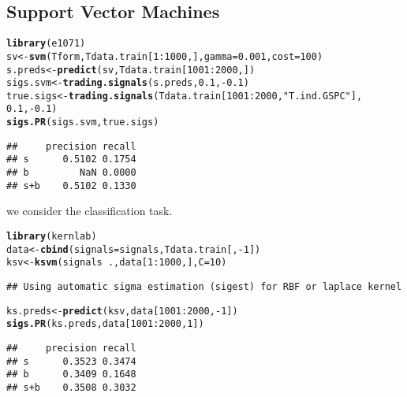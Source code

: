 \documentclass{article}\usepackage[]{graphicx}\usepackage[]{color}
\makeatletter
\newcommand{\hlnum}[1]{\textcolor[rgb]{0.686,0.059,0.569}{#1}}%
\newcommand{\hlstr}[1]{\textcolor[rgb]{0.192,0.494,0.8}{#1}}%
\newcommand{\hlopt}[1]{\textcolor[rgb]{0,0,0}{#1}}%
\newcommand{\hlstd}[1]{\textcolor[rgb]{0.345,0.345,0.345}{#1}}%
\newcommand{\hlkwb}[1]{\textcolor[rgb]{0.69,0.353,0.396}{#1}}%
\newcommand{\hlkwc}[1]{\textcolor[rgb]{0.333,0.667,0.333}{#1}}%
\newcommand{\hlkwd}[1]{\textcolor[rgb]{0.737,0.353,0.396}{\textbf{#1}}}%
\newenvironment{kframe}{%
 \def\at@end@of@kframe{}%
 \ifinner\ifhmode%
  \def\at@end@of@kframe{\end{minipage}}%
  \begin{minipage}{\columnwidth}%
 \fi\fi%
 \def\FrameCommand##1{\hskip\@totalleftmargin \hskip-\fboxsep
 \colorbox{shadecolor}{##1}\hskip-\fboxsep
     \hskip-\linewidth \hskip-\@totalleftmargin \hskip\columnwidth}%
 \MakeFramed {\advance\hsize-\width
   \@totalleftmargin\z@ \linewidth\hsize
   \@setminipage}}%
 {\par\unskip\endMakeFramed%
 \at@end@of@kframe}
\newenvironment{knitrout}{}{} %
\makeatother
\begin{document}
\subsection{Support Vector Machines}
\begin{knitrout}
\color{fgcolor}\begin{kframe}
\begin{alltt}
\hlkwd{library}\hlstd{(e1071)}
\hlstd{sv} \hlkwb{<-} \hlkwd{svm}\hlstd{(Tform, Tdata.train[}\hlnum{1}\hlopt{:}\hlnum{1000}\hlstd{, ],} \hlkwc{gamma} \hlstd{=} \hlnum{0.001}\hlstd{,} \hlkwc{cost} \hlstd{=} \hlnum{100}\hlstd{)}
\hlstd{s.preds} \hlkwb{<-} \hlkwd{predict}\hlstd{(sv, Tdata.train[}\hlnum{1001}\hlopt{:}\hlnum{2000}\hlstd{, ])}
\hlstd{sigs.svm} \hlkwb{<-} \hlkwd{trading.signals}\hlstd{(s.preds,} \hlnum{0.1}\hlstd{,} \hlopt{-}\hlnum{0.1}\hlstd{)}
\hlstd{true.sigs} \hlkwb{<-} \hlkwd{trading.signals}\hlstd{(Tdata.train[}\hlnum{1001}\hlopt{:}\hlnum{2000}\hlstd{,} \hlstr{"T.ind.GSPC"}\hlstd{],}
                             \hlnum{0.1}\hlstd{,} \hlopt{-}\hlnum{0.1}\hlstd{)}
\hlkwd{sigs.PR}\hlstd{(sigs.svm, true.sigs)}
\end{alltt}
\begin{verbatim}
##     precision recall
## s      0.5102 0.1754
## b         NaN 0.0000
## s+b    0.5102 0.1330
\end{verbatim}
\end{kframe}
\end{knitrout}
we consider the classification task.
\begin{knitrout}
\color{fgcolor}\begin{kframe}
\begin{alltt}
\hlkwd{library}\hlstd{(kernlab)}
\hlstd{data} \hlkwb{<-} \hlkwd{cbind}\hlstd{(}\hlkwc{signals} \hlstd{= signals, Tdata.train[ ,} \hlopt{-}\hlnum{1}\hlstd{])}
\hlstd{ksv} \hlkwb{<-} \hlkwd{ksvm}\hlstd{(signals} \hlopt{~} \hlstd{., data[}\hlnum{1}\hlopt{:}\hlnum{1000}\hlstd{, ],} \hlkwc{C} \hlstd{=} \hlnum{10}\hlstd{)}
\end{alltt}
\begin{verbatim}
## Using automatic sigma estimation (sigest) for RBF or laplace kernel
\end{verbatim}
\begin{alltt}
\hlstd{ks.preds} \hlkwb{<-} \hlkwd{predict}\hlstd{(ksv, data[}\hlnum{1001}\hlopt{:}\hlnum{2000}\hlstd{,} \hlopt{-}\hlnum{1}\hlstd{])}
\hlkwd{sigs.PR}\hlstd{(ks.preds, data[}\hlnum{1001}\hlopt{:}\hlnum{2000}\hlstd{,} \hlnum{1}\hlstd{])}
\end{alltt}
\begin{verbatim}
##     precision recall
## s      0.3523 0.3474
## b      0.3409 0.1648
## s+b    0.3508 0.3032
\end{verbatim}
\end{kframe}
\end{knitrout}
\end{document}
